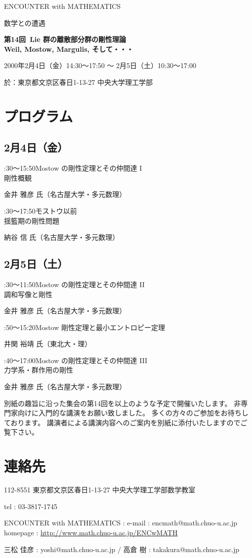 \documentclass[uplatex,dvipdfmx]{jlreq}
\newcommand{\talk}[3]{%
\noindent
#1\quad #2\par
\hspace*{2em}#3\par\smallskip
}
\newcommand{\EwMnumber}{第14回}
\newcommand{\EwMtitle}{Lie 群の離散部分群の剛性理論\\[2mm]\large Weil, Mostow, Margulis, そして・・・}
\newcommand{\EwMdate}{2000年2月4日（金）14:30～17:50 ～ 2月5日（土）10:30～17:00}
\newcommand{\EwMplace}{東京都文京区春日1-13-27 中央大学理工学部}
\newcommand{\EwMtitleblock}{

\vspace*{-5mm}

\begin{center}

{\Large ENCOUNTER with MATHEMATICS}

\vspace{2mm}

{\large 数学との遭遇}

\vspace{4mm}

{\Large \bfseries \EwMnumber\ \EwMtitle}

\vspace{4mm}

\EwMdate

\vspace{2mm}

於：\EwMplace

\end{center}

\vspace{2mm}

}
\begin{document}
\EwMtitleblock


\section*{プログラム}

\subsection*{2月4日（金）}

\talk
{14:30～15:50}
{Mostow の剛性定理とその仲間達 I\\[1mm]剛性概観}
{金井 雅彦 氏（名古屋大学・多元数理）}

\talk
{16:30～17:50}
{モストウ以前\\[1mm]揺籃期の剛性問題}
{納谷 信 氏（名古屋大学・多元数理）}

\subsection*{2月5日（土）}

\talk
{10:30～11:50}
{Mostow の剛性定理とその仲間達 II\\[1mm]調和写像と剛性}
{金井 雅彦 氏（名古屋大学・多元数理）}

\talk
{13:50～15:20}
{Mostow 剛性定理と最小エントロピー定理}
{井関 裕靖 氏（東北大・理）}

\talk
{15:40～17:00}
{Mostow の剛性定理とその仲間達 III\\[1mm]力学系・群作用の剛性}
{金井 雅彦 氏（名古屋大学・多元数理）}


\bigskip

別紙の趣旨に沿った集会の第14回を以上のような予定で開催いたします。  
非専門家向けに入門的な講演をお願い致しました。  
多くの方々のご参加をお待ちしております。  
講演者による講演内容へのご案内を別紙に添付いたしますのでご覧下さい。


\section*{連絡先}

112-8551 東京都文京区春日1-13-27 中央大学理工学部数学教室 

tel : 03-3817-1745  

ENCOUNTER with MATHEMATICS : e-mail : encmath@math.chuo-u.ac.jp  
homepage : \url{http://www.math.chuo-u.ac.jp/ENCwMATH}  

三松 佳彦 : yoshi@math.chuo-u.ac.jp / 高倉 樹 : takakura@math.chuo-u.ac.jp
\end{document}
